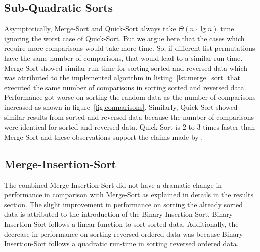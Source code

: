 \documentclass[sigconf, nonacm, natbib, screen, balance=False]{acmart}
\begin{document}
\subsection{Sub-Quadratic Sorts}\label{sec:sub-quad-disc}
Asymptotically, Merge-Sort and Quick-Sort always take $\Theta(n \cdot \lg n)$ time ignoring the worst case of Quick-Sort. But we argue here that the cases which require more comparisons would take more time. So, if different list permutations have the same number of comparisons, that would lead to a similar run-time. Merge-Sort showed similar run-time for sorting sorted and reversed data which was attributed to the implemented algorithm in listing~\ref{lst:merge_sort} that executed the same number of comparisons in sorting sorted and reversed data. Performance got worse on sorting the random data as the number of comparisons increased as shown in figure~\ref{fig:comparisons}. Similarly, Quick-Sort showed similar results from sorted and reversed data because the number of comparisons were identical for sorted and reversed data. Quick-Sort is $2$ to $3$ times faster than Merge-Sort and these observations support the claims made by \citet{skienna08}. 

\subsection{Merge-Insertion-Sort}\label{sec:comb-disc}
The combined Merge-Insertion-Sort did not have a dramatic change in performance in comparison with Merge-Sort as explained in details in the results section. The slight improvement in performance on sorting the already sorted data is attributed to the introduction of the Binary-Insertion-Sort. Binary-Insertion-Sort follows a linear function to sort sorted data. Additionally, the decrease in performance on sorting reversed ordered data was because Binary-Insertion-Sort follows a quadratic run-time in sorting reversed ordered data.           
\end{document}
